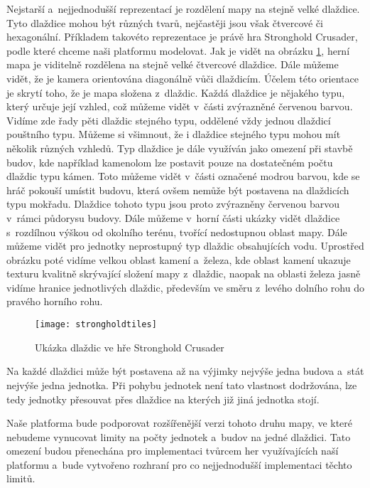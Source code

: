 Nejstarší a~nejjednodušší reprezentací je rozdělení mapy na stejně velké dlaždice. Tyto dlaždice mohou být různých tvarů, nejčastěji jsou však čtvercové či hexagonální. Příkladem takovéto reprezentace je právě hra Stronghold Crusader\citep{site:strongholdcrus}, podle které chceme naši platformu modelovat. Jak je vidět na obrázku  \ref{fig:tiletype}, herní mapa je viditelně rozdělena na stejně velké čtvercové dlaždice. Dále můžeme vidět, že je kamera orientována diagonálně vůči dlaždicím. Účelem této orientace je skrytí toho, že je mapa složena z~dlaždic. Každá dlaždice je nějakého typu, který určuje její vzhled, což můžeme vidět v~části zvýrazněné červenou barvou. Vidíme zde řady pěti dlaždic stejného typu, oddělené vždy jednou dlaždicí pouštního typu. Můžeme si všimnout, že i dlaždice stejného typu mohou mít několik různých vzhledů. Typ dlaždice je dále využíván jako omezení při stavbě budov, kde například kamenolom lze postavit pouze na dostatečném počtu dlaždic typu kámen. Toto můžeme vidět v~části označené modrou barvou, kde se hráč pokouší umístit budovu, která ovšem nemůže být postavena na dlaždicích typu mokřadu. Dlaždice tohoto typu jsou proto zvýrazněny červenou barvou v~rámci půdorysu budovy. Dále můžeme v~horní části ukázky vidět dlaždice s~rozdílnou výškou od okolního terénu, tvořící nedostupnou oblast mapy. Dále můžeme vidět pro jednotky neprostupný typ dlaždic obsahujících vodu. Uprostřed obrázku poté vidíme velkou oblast kamení a~železa, kde oblast kamení ukazuje texturu kvalitně skrývající složení mapy z~dlaždic, naopak na oblasti železa jasně vidíme hranice jednotlivých dlaždic, především ve směru z~levého dolního rohu do pravého horního rohu.

\begin{figure}[h]
	\centering
	\texttt{[image: strongholdtiles]}
	\caption{Ukázka dlaždic ve hře Stronghold Crusader}
	\label{fig:tiletype}
\end{figure}

Na každé dlaždici může být postavena až na výjimky nejvýše jedna budova a~stát nejvýše jedna jednotka. Při pohybu jednotek není tato vlastnost dodržována, lze tedy jednotky přesouvat přes dlaždice na kterých již jiná jednotka stojí. 

Naše platforma bude podporovat rozšířenější verzi tohoto druhu mapy, ve které nebudeme vynucovat limity na počty jednotek a~budov na jedné dlaždici. Tato omezení budou přenechána pro implementaci tvůrcem her využívajících naší platformu a~bude vytvořeno rozhraní pro co nejjednodušší implementaci těchto limitů. 

